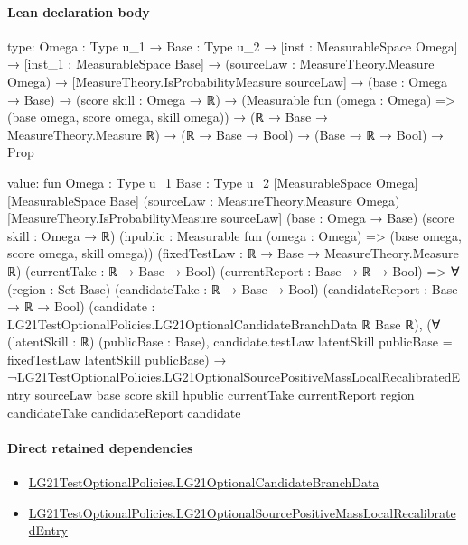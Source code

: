 \documentclass[10pt]{article}
\begin{document}
\paragraph{Lean declaration body}
\begin{ReviewVerbatim}
type:
{Omega : Type u_1} →
  {Base : Type u_2} →
    [inst : MeasurableSpace Omega] →
      [inst_1 : MeasurableSpace Base] →
        (sourceLaw : MeasureTheory.Measure Omega) →
          [MeasureTheory.IsProbabilityMeasure sourceLaw] →
            (base : Omega → Base) →
              (score skill : Omega → ℝ) →
                (Measurable fun (omega : Omega) => (base omega, score omega, skill omega)) →
                  (ℝ → Base → MeasureTheory.Measure ℝ) → (ℝ → Base → Bool) → (Base → ℝ → Bool) → Prop

value:
fun {Omega : Type u_1} {Base : Type u_2} [MeasurableSpace Omega] [MeasurableSpace Base]
    (sourceLaw : MeasureTheory.Measure Omega) [MeasureTheory.IsProbabilityMeasure sourceLaw] (base : Omega → Base)
    (score skill : Omega → ℝ) (hpublic : Measurable fun (omega : Omega) => (base omega, score omega, skill omega))
    (fixedTestLaw : ℝ → Base → MeasureTheory.Measure ℝ) (currentTake : ℝ → Base → Bool)
    (currentReport : Base → ℝ → Bool) =>
  ∀ (region : Set Base) (candidateTake : ℝ → Base → Bool) (candidateReport : Base → ℝ → Bool)
    (candidate : LG21TestOptionalPolicies.LG21OptionalCandidateBranchData ℝ Base ℝ),
    (∀ (latentSkill : ℝ) (publicBase : Base),
        candidate.testLaw latentSkill publicBase = fixedTestLaw latentSkill publicBase) →
      ¬LG21TestOptionalPolicies.LG21OptionalSourcePositiveMassLocalRecalibratedEntry sourceLaw base score skill hpublic
          currentTake currentReport region candidateTake candidateReport candidate
\end{ReviewVerbatim}

\paragraph{Direct retained dependencies}
\begin{itemize}\raggedright
\item \hyperlink{governing-declaration-5ca7587508e20c80}{LG21\allowbreak{}Test\allowbreak{}Optional\allowbreak{}Policies.\allowbreak{}LG21\allowbreak{}Optional\allowbreak{}Candidate\allowbreak{}Branch\allowbreak{}Data}
\item \hyperlink{governing-declaration-d5032f139400c4aa}{LG21\allowbreak{}Test\allowbreak{}Optional\allowbreak{}Policies.\allowbreak{}LG21\allowbreak{}Optional\allowbreak{}Source\allowbreak{}Positive\allowbreak{}Mass\allowbreak{}Local\allowbreak{}Recalibrated\allowbreak{}Entry}
\end{itemize}
\hypertarget{governing-declaration-2308f52507427ac8}{}
\end{document}
